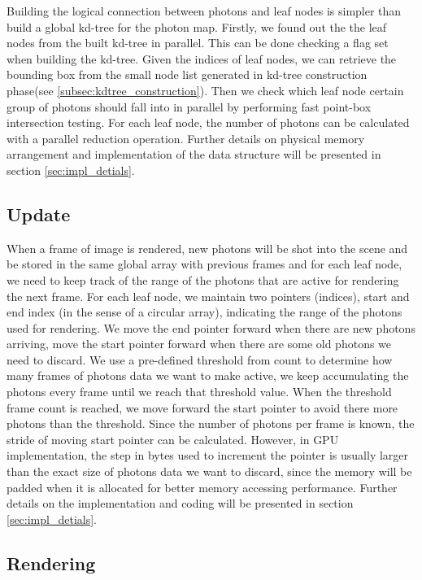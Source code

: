 Building the logical connection between photons and leaf nodes is simpler than build a global kd-tree for the photon map. Firstly, we found out the the leaf nodes from the built kd-tree in parallel. This can be done checking a flag set when building the kd-tree. Given the indices of leaf nodes, we can retrieve the bounding box from the small node list generated in kd-tree construction phase(see \ref{subsec:kdtree_construction}). Then we check which leaf node certain group of photons should fall into in parallel by performing fast point-box intersection testing. For each leaf node, the number of photons can be calculated with a parallel reduction operation. Further details on physical memory arrangement and implementation of the data structure  will be presented in section \ref{sec:impl_detials}.

\subsection{Update}

When a frame of image is rendered, new photons will be shot into the scene and be stored in the same global array with previous frames and for each leaf node, we need to keep track of the range of the photons that are active for rendering the next frame. For each leaf node, we maintain two pointers (indices), start and end index (in the sense of a circular array), indicating the range of the photons used for rendering. We move the end pointer forward when there are new photons arriving, move the start pointer forward when there are some old photons we need to discard. We use a pre-defined threshold from count to determine how many frames of photons data we want to make active, we keep accumulating the photons every frame until we reach that threshold value. When the threshold frame count
is reached, we move forward the start pointer to avoid there more photons than the threshold. Since the number of photons per frame is known, the stride of moving start pointer can be calculated.
However, in GPU implementation, the step in bytes used to increment the pointer is usually larger than the exact size of photons data we want to discard, since the memory will be padded when it is allocated for better memory accessing performance. Further details on the implementation and coding will be presented in section \ref{sec:impl_detials}.

\subsection{Rendering}

